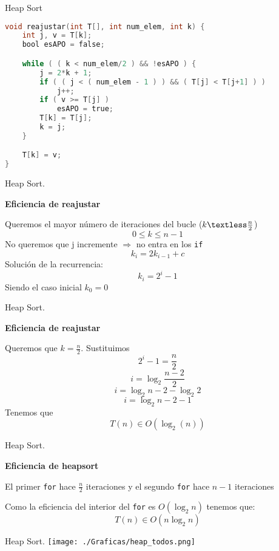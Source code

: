\documentclass[10pt, xcolor=table]{beamer}
\begin{document}
\begin{frame}[fragile]{Heap Sort}
\begin{lstlisting}[language=C]
void reajustar(int T[], int num_elem, int k) {
	int j, v = T[k];
	bool esAPO = false;

	while ( ( k < num_elem/2 ) && !esAPO ) {
		j = 2*k + 1;
		if ( ( j < ( num_elem - 1 ) ) && ( T[j] < T[j+1] ) )
			j++;
		if ( v >= T[j] )
			esAPO = true;
		T[k] = T[j];
		k = j;
	}

	T[k] = v;
}
\end{lstlisting}
\end{frame}

\begin{frame}[fragile]{Heap Sort. 
}
\begin{center}
	\textbf{\large{Eficiencia de reajustar}}
\end{center}
Queremos el mayor número de iteraciones del bucle ($k \textless \frac{n}{2}$) $$ 0 \leq k \leq n-1$$ No queremos que j incremente $\Rightarrow$ no entra en los \texttt{if}
$$k_i = 2k_{i-1} +c$$ 
Solución de la recurrencia: $$k_i = 2^i -1$$ Siendo el caso inicial $k_0 = 0$

\end{frame}

\begin{frame}[fragile]{Heap Sort. 
}
\begin{center}
\textbf{\large{Eficiencia de reajustar}}
\end{center}
Queremos que $k = \frac{n}{2}$. Sustituimos $$2^i-1=\frac{n}{2}$$ $$i=\log_2{\frac{n-2}{2}}$$ $$i=\log_2{n-2}-\log_2{2}$$ $$i=\log_2{n-2}-1$$ Tenemos que $$T(n) \in O(\log_2(n))$$

\end{frame}

\begin{frame}[fragile]{Heap Sort. 
}
\begin{center}
\textbf{\large{Eficiencia de heapsort}}
\end{center}
El primer \texttt{for} hace $\frac{n}{2}$ iteraciones y el segundo \texttt{for} hace $n-1$ iteraciones

Como la eficiencia del interior del \texttt{for} es $O(\log_2{n})$ tenemos que: $$T(n) \in O(n\log_2{n})$$

\end{frame}

\begin{frame}[fragile]{Heap Sort. 
}
\texttt{[image: ./Graficas/heap\_todos.png]}
\end{frame}
\end{document}
